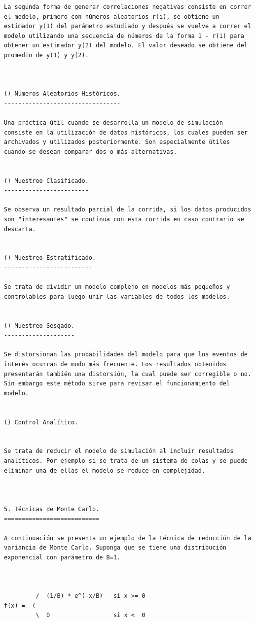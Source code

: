 \begin{verbatim}
La segunda forma de generar correlaciones negativas consiste en correr el modelo, primero con números aleatorios r(i), se obtiene un estimador y(1) del parámetro estudiado y después se vuelve a correr el modelo utilizando una secuencia de números de la forma 1 - r(i) para obtener un estimador y(2) del modelo. El valor deseado se obtiene del promedio de y(1) y y(2).



() Números Aleatorios Históricos.
---------------------------------

Una práctica útil cuando se desarrolla un modelo de simulación consiste en la utilización de datos históricos, los cuales pueden ser archivados y utilizados posteriormente. Son especialmente útiles cuando se desean comparar dos o más alternativas.


() Muestreo Clasificado.
------------------------

Se observa un resultado parcial de la corrida, si los datos producidos son "interesantes" se continua con esta corrida en caso contrario se descarta.


() Muestreo Estratificado.
-------------------------

Se trata de dividir un modelo complejo en modelos más pequeños y controlables para luego unir las variables de todos los modelos.


() Muestreo Sesgado.
--------------------

Se distorsionan las probabilidades del modelo para que los eventos de interés ocurran de modo más frecuente. Los resultados obtenidos presentarán también una distorsión, la cual puede ser corregible o no. Sin embargo este método sirve para revisar el funcionamiento del modelo.


() Control Analítico.
---------------------

Se trata de reducir el modelo de simulación al incluir resultados analíticos. Por ejemplo si se trata de un sistema de colas y se puede eliminar una de ellas el modelo se reduce en complejidad.



5. Técnicas de Monte Carlo.
===========================

A continuación se presenta un ejemplo de la técnica de reducción de la variancia de Monte Carlo. Suponga que se tiene una distribución exponencial con parámetro de B=1.



         /  (1/B) * e^(-x/B)   si x >= 0
f(x) =  (
         \  0                  si x <  0





\end{verbatim}
